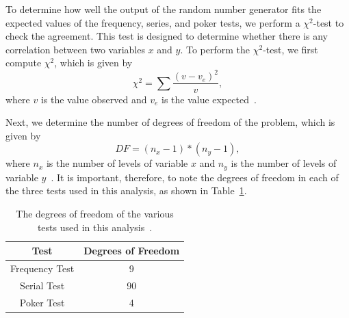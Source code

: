 \documentclass[12pt]{article}
\numberwithin{equation}{section}
\begin{document}
\par To determine how well the output of the random number generator fits the expected values of the frequency, series, and poker tests, we perform a $\chi^{2}$-test to check the agreement.  This test is designed to determine whether there is any correlation between two variables $x$ and $y$.  To perform the $\chi^{2}$-test, we first compute $\chi^{2}$, which is given by
\begin{equation}
\label{eq:chi2}
\chi^{2}=\sum\frac{\left(v-v_{e}\right)^{2}}{v},
\end{equation}
where $v$ is the value observed and $v_{e}$ is the value expected~\cite{babington}.  
\par Next, we determine the number of degrees of freedom of the problem, which is given by 
\begin{equation}
\label{eq:degfree}
DF = (n_{x}-1)*(n_{y}-1),
\end{equation}
where $n_{x}$ is the number of levels of variable $x$ and $n_{y}$ is the number of levels of variable $y$~\cite{chi}.  It is important, therefore, to note the degrees of freedom in each of the three tests used in this analysis, as shown in Table~\ref{tab:degfree}.

\begin{table}[ht]
\begin{center}
\begin{tabular}{c|c} \hline
	Test & Degrees of Freedom \\ \hline
     Frequency Test & 9 \\
     Serial Test & 90 \\
     Poker Test & 4 \\ \hline
\end{tabular}
\caption{The degrees of freedom of the various tests used in this analysis~\cite{babington}.}
\label{tab:degfree}
\end{center}
\end{table}
\end{document}

